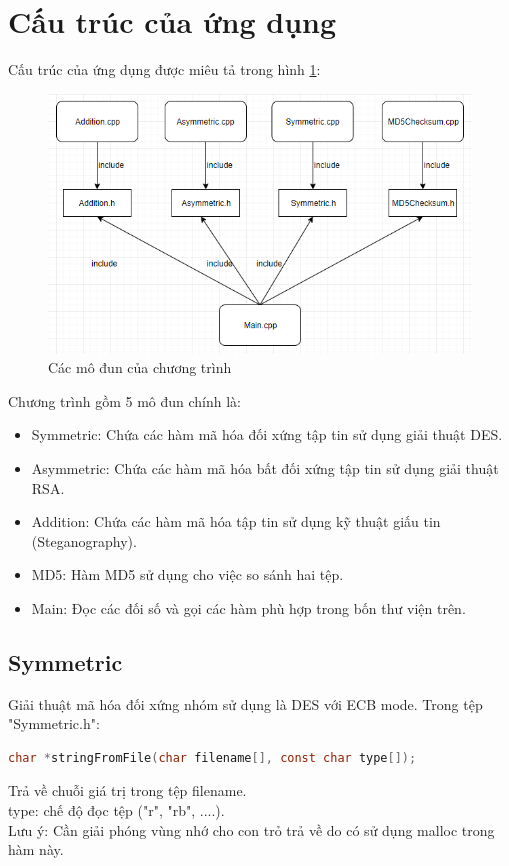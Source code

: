 \documentclass[a4paper]{article}
\begin{document}
\section{Cấu trúc của ứng dụng}
Cấu trúc của ứng dụng được miêu tả trong hình \ref{fig:file_structure}:
\begin{figure}[htp]
    \centering
    \includegraphics[scale=1]{file_structure.png}
    \caption{Các mô đun của chương trình}
    \label{fig:file_structure}
\end{figure}
Chương trình gồm 5 mô đun chính là:
\begin{itemize}
    \item Symmetric: Chứa các hàm mã hóa đối xứng tập tin sử dụng giải thuật DES.
    \item Asymmetric: Chứa các hàm mã hóa bất đối xứng tập tin sử dụng giải thuật RSA.
    \item Addition: Chứa các hàm mã hóa tập tin sử dụng kỹ thuật giấu tin (Steganography).
    \item MD5: Hàm MD5 sử dụng cho việc so sánh hai tệp.
    \item Main: Đọc các đối số và gọi các hàm phù hợp trong bốn thư viện trên.
\end{itemize}
	\subsection{Symmetric}
	Giải thuật mã hóa đối xứng nhóm sử dụng là DES với ECB mode. Trong tệp "Symmetric.h":\\
	\begin{lstlisting}[language=C]
char *stringFromFile(char filename[], const char type[]);
	\end{lstlisting}
	Trả về chuỗi giá trị trong tệp filename.\\
	type: chế độ đọc tệp ("r", "rb", ....).\\
	Lưu ý: Cần giải phóng vùng nhớ cho con trỏ trả về do có sử dụng malloc trong hàm này.\\
\end{document}
